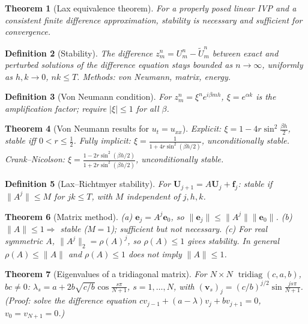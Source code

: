 \documentclass[10pt,a4paper]{article}
\theoremstyle{tight}
\newtheorem{theorem}{Theorem}[section]
\newtheorem{definition}[theorem]{Definition}
\begin{document}
\begin{theorem}[Lax equivalence theorem]
For a properly posed linear IVP and a consistent finite difference approximation,
stability is necessary and sufficient for convergence.
\end{theorem}

\begin{definition}[Stability]
The difference \(z_m^n=U_m^n-\widetilde U_m^n\) between exact and perturbed solutions of the difference
equation stays bounded as \(n\to\infty\), uniformly as \(h,k\to0\), \(nk\le T\). Methods: von Neumann,
matrix, energy.
\end{definition}

\begin{definition}[Von Neumann condition]
For \(z_m^n=\xi^ne^{i\beta mh}\), \(\xi=e^{\alpha k}\) is the amplification factor; require
\(|\xi|\le1\) for all \(\beta\).
\end{definition}

\begin{theorem}[Von Neumann results for \(u_t=u_{xx}\)]
Explicit: \(\xi=1-4r\sin^2\frac{\beta h}2\), stable iff \(0<r\le\frac12\).
Fully implicit: \(\xi=\frac1{1+4r\sin^2(\beta h/2)}\), unconditionally stable.
Crank--Nicolson: \(\xi=\frac{1-2r\sin^2(\beta h/2)}{1+2r\sin^2(\beta h/2)}\), unconditionally stable.
\end{theorem}

\begin{definition}[Lax--Richtmyer stability]
For \(\mathbf U_{j+1}=A\mathbf U_j+\mathbf f_j\): stable if \(\|A^j\|\le M\) for \(jk\le T\), with
\(M\) independent of \(j,h,k\).
\end{definition}

\begin{theorem}[Matrix method]
(a) \(\mathbf e_j=A^j\mathbf e_0\), so \(\|\mathbf e_j\|\le\|A^j\|\|\mathbf e_0\|\).
(b) \(\|A\|\le1\Rightarrow\) stable (\(M=1\)); sufficient but not necessary.
(c) For real symmetric \(A\), \(\|A^j\|_2=\rho(A)^j\), so \(\rho(A)\le1\) gives stability.
In general \(\rho(A)\le\|A\|\) and \(\rho(A)\le1\) does not imply \(\|A\|\le1\).
\end{theorem}

\begin{theorem}[Eigenvalues of a tridiagonal matrix]
For \(N\times N\) \(\operatorname{tridiag}(c,a,b)\), \(bc\ne0\):
\(\lambda_s=a+2b\sqrt{c/b}\cos\frac{s\pi}{N+1}\), \(s=1,\dots,N\), with
\((\mathbf v_s)_j=(c/b)^{j/2}\sin\frac{js\pi}{N+1}\). (Proof: solve the difference equation
\(cv_{j-1}+(a-\lambda)v_j+bv_{j+1}=0\), \(v_0=v_{N+1}=0\).)
\end{theorem}
\end{document}
